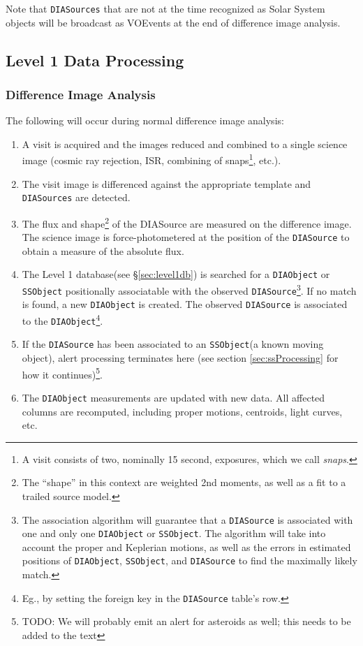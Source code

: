 \documentclass[12pt]{article}
\newcommand{\code}[1]{\texttt{#1}}
\newcommand{\DIASource}{\code{DIASource}\xspace}
\newcommand{\DIASources}{\code{DIASources}\xspace}
\newcommand{\DIAObject}{\code{DIAObject}\xspace}
\newcommand{\DB}{{Level 1 database}\xspace}
\newcommand{\SSObject}{\code{SSObject}\xspace}
\begin{document}
Note that \DIASources that are not at the time recognized as Solar System objects will be broadcast as VOEvents at the end of difference image analysis.

\subsection{Level 1 Data Processing}

\subsubsection{Difference Image Analysis}

The following will occur during normal difference image analysis:
\begin{enumerate}
\item A visit is acquired and the images reduced and combined to a single science image (cosmic ray rejection, ISR, combining of snaps\footnote{A visit consists of two, nominally 15 second, exposures, which we call {\em snaps}.}, etc.).
\item The visit image is differenced against the appropriate template and \DIASources are detected.
\item The flux and shape\footnote{The ``shape'' in this context are weighted 2nd moments, as well as a fit to a trailed source model.} of the DIASource are measured on the difference image. The science image is force-photometered at the position of the \DIASource to obtain a measure of the absolute flux.
\item The \DB (see \S \ref{sec:level1db}) is searched for a \DIAObject or \SSObject positionally associatable with the observed \DIASource\footnote{The association algorithm will guarantee that a \DIASource is associated with one and only one \DIAObject or \SSObject. The algorithm will take into account the proper and Keplerian motions, as well as the errors in estimated positions of \DIAObject, \SSObject, and \DIASource to find the maximally likely match.}. If no match is found, a new \DIAObject is created. The observed \DIASource is associated to the \DIAObject\footnote{Eg., by setting the foreign key in the \DIASource table's row.}.
\item If the \DIASource has been associated to an \SSObject (a known moving object), alert processing terminates here (see section \ref{sec:ssProcessing} for how it continues)\footnote{TODO: We will probably emit an alert for asteroids as well; this needs to be added to the text}.
\item The \DIAObject measurements are updated with new data. All affected columns are recomputed, including proper motions, centroids, light curves, etc.

\end{enumerate}
\end{document}
